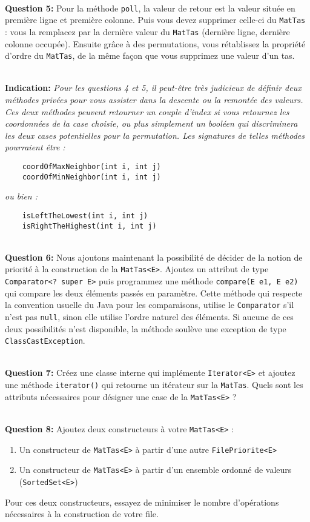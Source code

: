 \documentclass[iutinfo,10pt]{ustl-tdtp}
\begin{document}
~\\ \textbf{Question 5:} 
Pour la méthode \texttt{poll}, la valeur de retour est la valeur située en première ligne et première colonne. Puis vous devez supprimer celle-ci du \texttt{MatTas} : vous la remplacez par la dernière valeur du \texttt{MatTas} (dernière ligne, dernière colonne occupée). Ensuite grâce à des permutations, vous rétablissez la propriété d'ordre du \texttt{MatTas}, de la même façon que vous supprimez une valeur d'un tas.

~\\ \textbf{Indication:} \textit{Pour les questions 4 et 5, il peut-être très judicieux de définir deux méthodes privées pour vous assister dans la descente ou la remontée des valeurs. Ces deux méthodes peuvent retourner un couple d'index si vous retournez les coordonnées de la case choisie, ou plus simplement un booléen qui discriminera les deux cases potentielles pour la permutation. Les signatures de telles méthodes pourraient être :}
\begin{verbatim}
    coordOfMaxNeighbor(int i, int j)
    coordOfMinNeighbor(int i, int j)
\end{verbatim}
\textit{ou bien :}
\begin{verbatim}
    isLeftTheLowest(int i, int j)
    isRightTheHighest(int i, int j)
\end{verbatim}

~\\ \textbf{Question 6:} 
Nous ajoutons maintenant la possibilité de décider de la notion de priorité à la construction de la \texttt{MatTas<E>}. Ajoutez un attribut de type \texttt{Comparator<? super E>} puis programmez une méthode \texttt{compare(E e1, E e2)} qui compare les deux éléments passés en paramètre. Cette méthode qui respecte la convention usuelle du Java pour les comparaisons, utilise le \texttt{Comparator} s'il n'est pas \texttt{null}, sinon elle utilise l'ordre naturel des éléments. Si aucune de ces deux possibilités n'est disponible, la méthode soulève une exception de type \texttt{ClassCastException}.

~\\ \textbf{Question 7:} 
Créez une classe interne qui implémente \texttt{Iterator<E>} et ajoutez une méthode \texttt{iterator()} qui retourne un itérateur sur la \texttt{MatTas}. Quels sont les attributs nécessaires pour désigner une case de la \texttt{MatTas<E>} ?

~\\ \textbf{Question 8:} 
Ajoutez deux constructeurs à votre \texttt{MatTas<E>} :
\begin{enumerate}
    \item Un constructeur de \texttt{MatTas<E>} à partir d'une autre \texttt{FilePriorite<E>}
    \item Un constructeur de \texttt{MatTas<E>} à partir d'un ensemble ordonné de valeurs (\texttt{SortedSet<E>})
\end{enumerate}
Pour ces deux constructeurs, essayez de minimiser le nombre d'opérations nécessaires à la construction de votre file.
\end{document}
